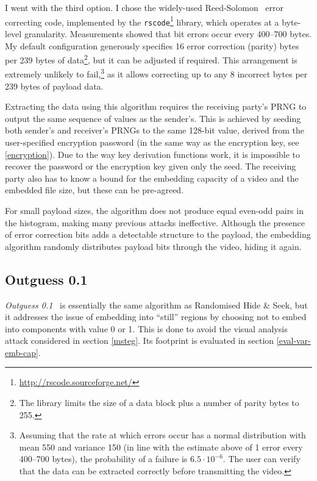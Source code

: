 \documentclass[12pt,british,twoside,notitlepage,usenames,dvipsnames,hypens,final]{report}
\numberwithin{equation}{section}
\numberwithin{figure}{section}
\begin{document}
I went with the third option. I chose the widely-used Reed-Solomon~\cite{clarke2002reed} error correcting code, implemented by the \texttt{rscode}\footnote{\url{http://rscode.sourceforge.net/}} library, which operates at a byte-level granularity. Measurements showed that bit errors occur every 400--700 bytes. My default configuration generously specifies 16 error correction (parity) bytes per 239 bytes of data\footnote{The library limits the size of a data block plus a number of parity bytes to 255.}, but it can be adjusted if required. This arrangement is extremely unlikely to fail,\footnote{Assuming that the rate at which errors occur has a normal distribution with mean 550 and variance 150 (in line with the estimate above of 1 error every 400--700 bytes), the probability of a failure is $6.5 \cdot 10^{-6}$. The user can verify that the data can be extracted correctly before transmitting the video.} as it allows correcting up to any 8 incorrect bytes per 239 bytes of payload data.

Extracting the data using this algorithm requires the receiving party's PRNG to output the same sequence of values as the sender's. This is achieved by seeding both sender's and receiver's PRNGs to the same 128-bit value, derived from the user-specified encryption password (in the same way as the encryption key, see \ref{encryption}). Due to the way key derivation functions work, it is impossible to recover the password or the encryption key given only the seed. The receiving party also has to know a bound for the embedding capacity of a video and the embedded file size, but these can be pre-agreed.

For small payload sizes, the algorithm does not produce equal even-odd pairs in the histogram, making many previous attacks ineffective. Although the presence of error correction bits adds a detectable structure to the payload, the embedding algorithm randomly distributes payload bits through the video, hiding it again.

\subsection{Outguess 0.1}
\label{outguess1}

\emph{Outguess 0.1}~\cite{bateman} is essentially the same algorithm as Randomised Hide \& Seek, but it addresses the issue of embedding into ``still'' regions by choosing not to embed into components with value 0 or 1. This is done to avoid the visual analysis attack considered in section \ref{msteg}. Its footprint is evaluated in section \ref{eval-var-emb-cap}.
\end{document}
